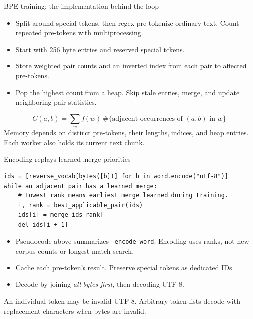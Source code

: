 \documentclass[11pt,aspectratio=169]{beamer}
\begin{document}
\begin{frame}{BPE training: the implementation behind the loop}
\begin{itemize}
\item Split around special tokens, then regex-pre-tokenize ordinary text. Count repeated pre-tokens with multiprocessing.
\item Start with 256 byte entries and reserved special tokens.
\item Store weighted pair counts and an inverted index from each pair to affected pre-tokens.
\item Pop the highest count from a heap. Skip stale entries, merge, and update neighboring pair statistics.
\end{itemize}
\[
C(a,b)=\sum_w f(w)\,\#\{\text{adjacent occurrences of }(a,b)\text{ in }w\}
\]
Memory depends on distinct pre-tokens, their lengths, indices, and heap entries. Each worker also holds its current text chunk.
\end{frame}

\begin{frame}[fragile]{Encoding replays learned merge priorities}
\begin{lstlisting}
ids = [reverse_vocab[bytes([b])] for b in word.encode("utf-8")]
while an adjacent pair has a learned merge:
    # Lowest rank means earliest merge learned during training.
    i, rank = best_applicable_pair(ids)
    ids[i] = merge_ids[rank]
    del ids[i + 1]
\end{lstlisting}
\begin{itemize}
\item Pseudocode above summarizes \texttt{\_encode\_word}. Encoding uses ranks, not new corpus counts or longest-match search.
\item Cache each pre-token's result. Preserve special tokens as dedicated IDs.
\item Decode by joining \emph{all bytes first}, then decoding UTF-8.
\end{itemize}
An individual token may be invalid UTF-8. Arbitrary token lists decode with replacement characters when bytes are invalid.
\end{frame}
\end{document}
